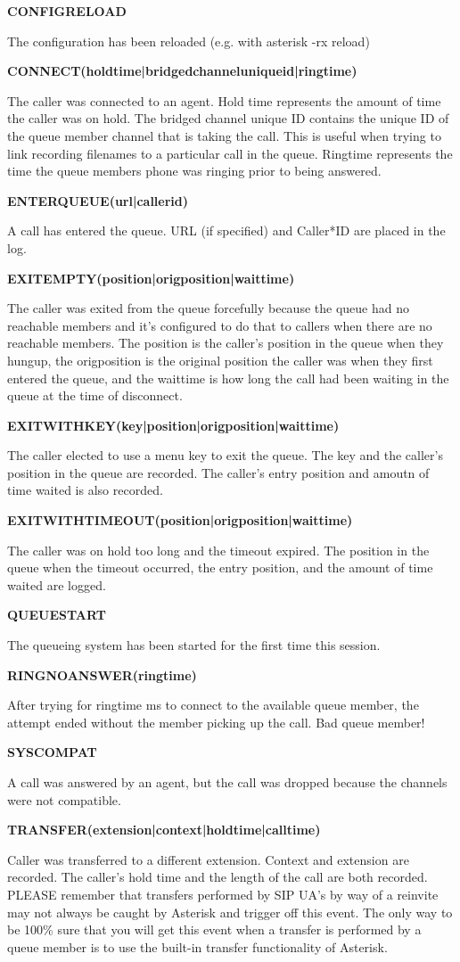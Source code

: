 \textbf{CONFIGRELOAD}

The configuration has been reloaded (e.g. with asterisk -rx reload)

\textbf{CONNECT(holdtime|bridgedchanneluniqueid|ringtime)}

The caller was connected to an agent.  Hold time represents the amount
of time the caller was on hold. The bridged channel unique ID contains
the unique ID of the queue member channel that is taking the call. This
is useful when trying to link recording filenames to a particular
call in the queue. Ringtime represents the time the queue members phone
was ringing prior to being answered.

\textbf{ENTERQUEUE(url|callerid)}

A call has entered the queue.  URL (if specified) and Caller*ID are placed
in the log.

\textbf{EXITEMPTY(position|origposition|waittime)}

The caller was exited from the queue forcefully because the queue had no
reachable members and it's configured to do that to callers when there
are no reachable members. The position is the caller's position in the
queue when they hungup, the origposition is the original position the 
caller was when they first entered the queue, and the waittime is how 
long the call had been waiting in the queue at the time of disconnect.

\textbf{EXITWITHKEY(key|position|origposition|waittime)}

The caller elected to use a menu key to exit the queue.  The key and
the caller's position in the queue are recorded.  The caller's entry
position and amoutn of time waited is also recorded.

\textbf{EXITWITHTIMEOUT(position|origposition|waittime)}

The caller was on hold too long and the timeout expired.  The position in the
queue when the timeout occurred, the entry position, and the amount of time
waited are logged.

\textbf{QUEUESTART}

The queueing system has been started for the first time this session.

\textbf{RINGNOANSWER(ringtime)}

After trying for ringtime ms to connect to the available queue member,
the attempt ended without the member picking up the call. Bad queue
member!

\textbf{SYSCOMPAT}

A call was answered by an agent, but the call was dropped because the 
channels were not compatible.

\textbf{TRANSFER(extension|context|holdtime|calltime)}

Caller was transferred to a different extension.  Context and extension
are recorded. The caller's hold time and the length of the call are both
recorded. PLEASE remember that transfers performed by SIP UA's by way
of a reinvite may not always be caught by Asterisk and trigger off this
event. The only way to be 100\% sure that you will get this event when
a transfer is performed by a queue member is to use the built-in transfer
functionality of Asterisk.

